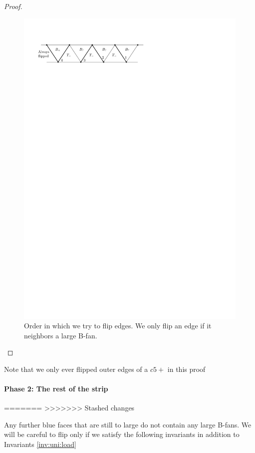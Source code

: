 \begin{proof}
  \begin{figure}[h]
    \centering
    \includegraphics[scale=1]{unifiedAlgo/img/placeEdges}
    \caption{Order in which we try to flip edges. We only flip an edge if it neighbors a large B-fan.}
    \label{fig:uni:placeedges}
  \end{figure}

\end{proof}

  Note that we only ever flipped outer edges of a $c5+$ in this proof


\paragraph{Phase 2: The rest of the strip}
=======
>>>>>>> Stashed changes

Any further blue faces that are still to large do not contain any large B-fans. We will be careful to flip only if we satisfy the following invariants in addition to Invariants \ref{inv:uni:load}


